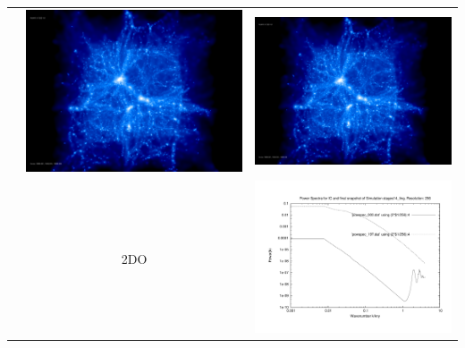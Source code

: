 \begin{itemize}
\begin{table}[p]
\begin{tabular}{l|c|c}
 & \includegraphics[scale=0.075]{r256/h100/stages14_ling/197.jpg} & \includegraphics[scale=0.075]{r256/h100/stages14_ling/197.jpg} \\
 & 2DO & \includegraphics[scale=0.25]{r256/h100/stages14_ling/plot_powspec_stages14_ling.pdf} \\

\end{tabular}
\end{table}
\end{itemize}
